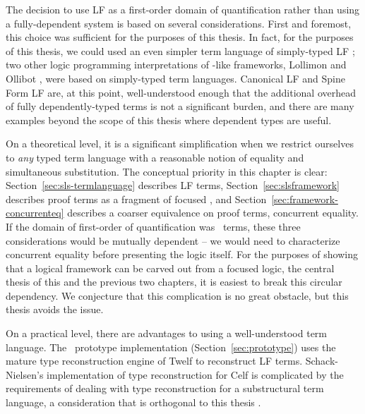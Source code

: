 The decision to use LF as a first-order domain of quantification
rather than using a fully-dependent system is based on several
considerations. First and foremost, this choice was sufficient for the
purposes of this thesis. In fact, for the purposes of this thesis, we
could used an even simpler term language of simply-typed LF
\cite{pfenning08church}; two other logic programming interpretations
of \sls-like frameworks, Lollimon \cite{lopez05monadic} and Ollibot
\cite{pfenning09substructural}, were based on simply-typed term
languages. Canonical LF and Spine Form LF are, at this point,
well-understood enough that the additional overhead of fully
dependently-typed terms is not a significant burden, and there are
many examples beyond the scope of this thesis where dependent types are
useful.

On a theoretical level, it is a significant simplification when we
restrict ourselves to {\it any} typed term language with a reasonable
notion of equality and simultaneous substitution. The conceptual
priority in this chapter is clear: Section~\ref{sec:sls-termlanguage}
describes LF terms, Section~\ref{sec:slsframework} describes proof
terms as a fragment of focused \ollll, and
Section~\ref{sec:framework-concurrenteq} describes a coarser
equivalence on proof terms, concurrent equality. If the domain of
first-order of quantification was \sls~terms, these three
considerations would be mutually dependent -- we would need to
characterize concurrent equality before presenting the logic
itself. For the purposes of showing that a logical framework can be
carved out from a focused logic, the central thesis of this and the
previous two chapters, it is easiest to break this circular
dependency. We conjecture that this complication is no great obstacle,
but this thesis avoids the issue.

On a practical level, there are advantages to using a well-understood
term language. The \sls~prototype implementation
(Section~\ref{sec:prototype}) uses the mature type reconstruction
engine of Twelf to reconstruct LF terms. Schack-Nielsen's
implementation of type reconstruction for Celf is complicated by the
requirements of dealing with type reconstruction for a substructural
term language, a consideration that is orthogonal to this
thesis \cite{schacknielsen08celf}. 

